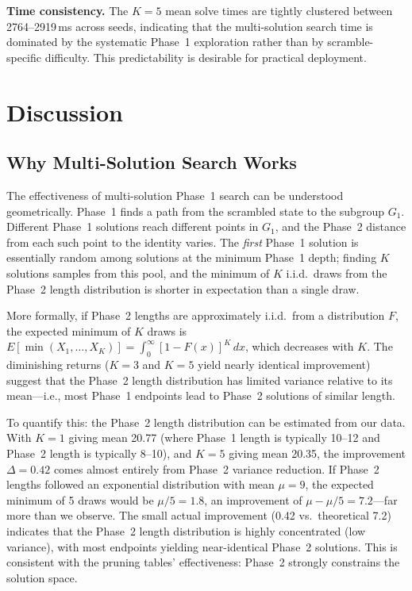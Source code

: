 \documentclass[conference]{IEEEtran}
\begin{document}
\textbf{Time consistency.} The $K{=}5$ mean solve times are tightly clustered between 2764--2919\,ms across seeds, indicating that the multi-solution search time is dominated by the systematic Phase~1 exploration rather than by scramble-specific difficulty. This predictability is desirable for practical deployment.

\FloatBarrier
\section{Discussion}
\label{sec:discussion}

\subsection{Why Multi-Solution Search Works}

The effectiveness of multi-solution Phase~1 search can be understood geometrically. Phase~1 finds a path from the scrambled state to the subgroup $G_1$. Different Phase~1 solutions reach different points in $G_1$, and the Phase~2 distance from each such point to the identity varies. The \emph{first} Phase~1 solution is essentially random among solutions at the minimum Phase~1 depth; finding $K$ solutions samples from this pool, and the minimum of $K$ i.i.d.\ draws from the Phase~2 length distribution is shorter in expectation than a single draw.

More formally, if Phase~2 lengths are approximately i.i.d.\ from a distribution $F$, the expected minimum of $K$ draws is $E[\min(X_1, \ldots, X_K)] = \int_0^\infty [1 - F(x)]^K \, dx$, which decreases with $K$. The diminishing returns ($K{=}3$ and $K{=}5$ yield nearly identical improvement) suggest that the Phase~2 length distribution has limited variance relative to its mean---i.e., most Phase~1 endpoints lead to Phase~2 solutions of similar length.

To quantify this: the Phase~2 length distribution can be estimated from our data. With $K{=}1$ giving mean 20.77 (where Phase~1 length is typically 10--12 and Phase~2 length is typically 8--10), and $K{=}5$ giving mean 20.35, the improvement $\Delta = 0.42$ comes almost entirely from Phase~2 variance reduction. If Phase~2 lengths followed an exponential distribution with mean $\mu = 9$, the expected minimum of 5 draws would be $\mu/5 = 1.8$, an improvement of $\mu - \mu/5 = 7.2$---far more than we observe. The small actual improvement (0.42 vs.\ theoretical 7.2) indicates that the Phase~2 length distribution is highly concentrated (low variance), with most endpoints yielding near-identical Phase~2 solutions. This is consistent with the pruning tables' effectiveness: Phase~2 strongly constrains the solution space.
\end{document}

